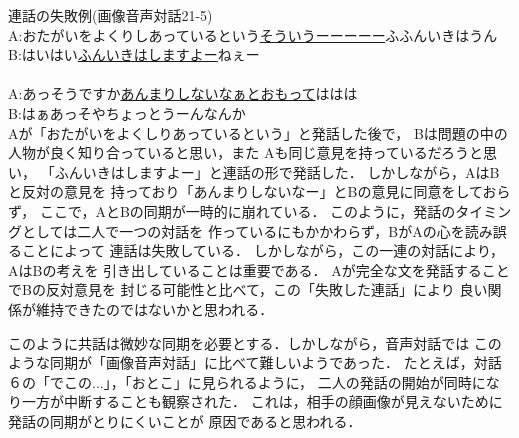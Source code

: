 \hspace*{-0.5cm}{\bf 対話５}\hspace{0.33cm}連話の失敗例(画像音声対話21-5)\\
A:おたがいをよくりしあっているという\hspace{0.17cm}\underline{そういうーーーーー}ふ\hspace{0.17cm}ふんいきは\hspace{0.17cm}うん\\
B:\hspace{3.7cm}は\hspace{0.17cm}い\hspace{1.33cm}はい\hspace{0.83cm}\underline{ふんいきはしますよー}\hspace{0.17cm}ねぇー\\
\vspace{-0.3cm}\\
A:あっ\hspace{0.17cm}そうですか\hspace{0.33cm}\underline{あんまりしないなぁとおもって}\hspace{0.33cm}ははは\\
B:\hspace{4.0cm}はぁ\hspace{1.33cm}あっ\hspace{0.75cm}そやちょっと\hspace{0.17cm}うーんなんか\\

Aが「おたがいをよくしりあっているという」と発話した後で，
Bは問題の中の人物が良く知り合っていると思い，また
Aも同じ意見を持っているだろうと思い，
「ふんいきはしますよー」と連話の形で発話した．
しかしながら，AはBと反対の意見を
持っており「あんまりしないなー」とBの意見に同意をしておらず，
ここで，AとBの同期が一時的に崩れている．
このように，発話のタイミングとしては二人で一つの対話を
作っているにもかかわらず，BがAの心を読み誤ることによって
連話は失敗している．
しかしながら，この一連の対話により，AはBの考えを
引き出していることは重要である．
Aが完全な文を発話することでBの反対意見を
封じる可能性と比べて，この「失敗した連話」により
良い関係が維持できたのではないかと思われる．

このように共話は微妙な同期を必要とする．しかしながら，音声対話では
このような同期が「画像音声対話」に比べて難しいようであった．
たとえば，対話６の「でこの...」，「おとこ」に見られるように，
二人の発話の開始が同時になり一方が中断することも観察された．
これは，相手の顔画像が見えないために発話の同期がとりにくいことが
原因であると思われる．

